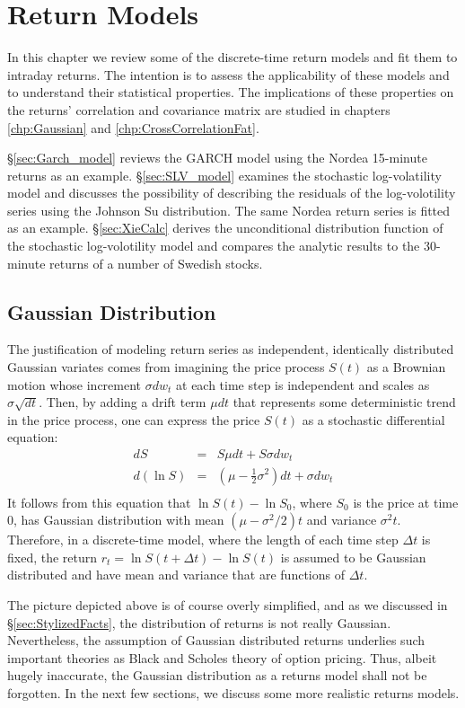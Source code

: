 \chapter{Return Models}\label{chp:PriceModels}
In this chapter we review some of the discrete-time return models and
fit them to intraday returns. The intention is to assess the
applicability of these models and to understand their statistical
properties. The implications of these properties on the returns'
correlation and covariance matrix are studied in chapters
\ref{chp:Gaussian} and \ref{chp:CrossCorrelationFat}.

\S\ref{sec:Garch_model} reviews the GARCH model using the Nordea
15-minute returns as an example. \S\ref{sec:SLV_model} examines the
stochastic log-volatility model and discusses the possibility of
describing the residuals of the log-volotility series using the
Johnson Su distribution. The same Nordea return series is fitted as an
example. \S\ref{sec:XieCalc} derives the unconditional distribution
function of the stochastic log-volotility model and compares the
analytic results to the 30-minute returns of a number of Swedish
stocks.

\section{Gaussian Distribution}
The justification of modeling return series as independent,
identically distributed Gaussian variates comes from imagining the
price process $S(t)$ as a Brownian motion whose increment $\sigma
dw_t$ at each time step is independent and scales as $\sigma
\sqrt{dt}$. Then, by adding a drift term $\mu dt$ that represents some
deterministic trend in the price process, one can express the
price $S(t)$ as a stochastic differential equation:
\begin{eqnarray*}
  dS &=& S\mu dt + S\sigma dw_t \\
  d(\ln S) &=& (\mu - \frac{1}{2} \sigma^2)dt + \sigma dw_t \\
\end{eqnarray*}
It follows from this equation that $\ln S(t) - \ln S_0$, where $S_0$
is the price at time 0, has Gaussian distribution with mean $(\mu -
\sigma^2/2)t$ and variance $\sigma^2 t$. Therefore, in a discrete-time
model, where the length of each time step $\Delta t$ is fixed, the
return $r_t = \ln S(t + \Delta t) - \ln S(t)$ is assumed to be
Gaussian distributed and have mean and variance that are functions of
$\Delta t$.

The picture depicted above is of course overly simplified, and as we discussed in
\S\ref{sec:StylizedFacts}, the distribution of returns is not really
Gaussian. Nevertheless, the assumption of Gaussian distributed returns
underlies such important theories as Black and Scholes theory of
option pricing. Thus, albeit hugely inaccurate, the Gaussian
distribution as a returns model shall not be forgotten. In the next
few sections, we discuss some more realistic returns models.

